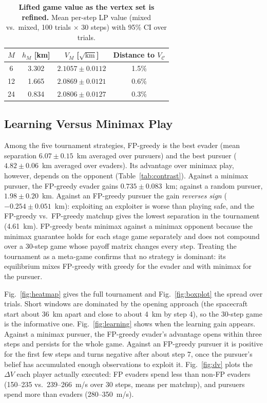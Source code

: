\documentclass[letterpaper, 10 pt, conference]{ieeeconf}  %
\begin{document}
\begin{table}[!t]
\centering
\caption{\textbf{Lifted game value as the vertex set is refined.} Mean per-step LP value (mixed vs.\ mixed, 100 trials $\times$ 30 steps) with 95\% CI over trials.}
\begin{tabular}{cccc}
\toprule
$M$ & $h_M$ [km] & $V_M$ [$\sqrt{\mathrm{km}}$] & Distance to $V_{\mathcal{C}}$ \\
\midrule
6  & 3.302 & $2.1057 \pm 0.0112$ & 1.5\% \\
12 & 1.665 & $2.0869 \pm 0.0121$ & 0.6\% \\
24 & 0.834 & $2.0806 \pm 0.0127$ & 0.3\% \\
\bottomrule
\end{tabular}
\label{tab:lifting}
\end{table}

\subsection{Learning Versus Minimax Play}

Among the five tournament strategies, FP-greedy is the best evader (mean separation $6.07 \pm 0.15$~km averaged over pursuers) and the best pursuer ($4.82 \pm 0.06$~km averaged over evaders). Its advantage over minimax play, however, depends on the opponent (Table~\ref{tab:contrast}). Against a minimax pursuer, the FP-greedy evader gains $0.735 \pm 0.083$~km; against a random pursuer, $1.98 \pm 0.20$~km. Against an FP-greedy pursuer the gain \emph{reverses sign} ($-0.254 \pm 0.051$~km): exploiting an exploiter is worse than playing safe, and the FP-greedy vs.\ FP-greedy matchup gives the lowest separation in the tournament (4.61~km). FP-greedy beats minimax against a minimax opponent because the minimax guarantee holds for each stage game separately and does not compound over a 30-step game whose payoff matrix changes every step. Treating the tournament as a meta-game confirms that no strategy is dominant: its equilibrium mixes FP-greedy with greedy for the evader and with minimax for the pursuer.

Fig.~\ref{fig:heatmap} gives the full tournament and Fig.~\ref{fig:boxplot} the spread over trials. Short windows are dominated by the opening approach (the spacecraft start about 36~km apart and close to about 4~km by step 4), so the 30-step game is the informative one. Fig.~\ref{fig:learning} shows when the learning gain appears. Against a minimax pursuer, the FP-greedy evader's advantage opens within three steps and persists for the whole game. Against an FP-greedy pursuer it is positive for the first few steps and turns negative after about step 7, once the pursuer's belief has accumulated enough observations to exploit it. Fig.~\ref{fig:dv} plots the $\Delta V$ each player actually executed: FP evaders spend less than non-FP evaders (150--235 vs.\ 239--266~m/s over 30 steps, means per matchup), and pursuers spend more than evaders (280--350~m/s).
\end{document}

